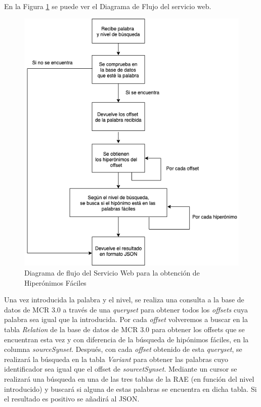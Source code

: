 En la Figura \ref{fig:swhiperonimos} se puede ver el Diagrama de Flujo del servicio web.
\begin{figure}[!h]
	\includegraphics[width=.9\textwidth]{Imagenes/Bitmap/Capitulo4/ServiciosWeb/DiagramaFlujoHiperonimos.png}
	\centering
	\caption{Diagrama de flujo del Servicio Web para la obtención de Hiperónimos Fáciles}
	\label{fig:swhiperonimos}
\end{figure}

Una vez introducida la palabra y el nivel, se realiza una consulta a la base de datos de MCR 3.0 a través de una \textit{queryset} para obtener todos los \textit{offsets} cuya palabra sea igual que la introducida.
Por cada \textit{offset} volveremos a buscar en la tabla \textit{Relation} de la base de datos de MCR 3.0 para obtener los offsets que se encuentran esta vez y con diferencia de la búsqueda de hipónimos fáciles, en la columna \textit{sourceSynset}. Después, con cada \textit{offset} obtenido de esta \textit{queryset}, se realizará la búsqueda en la tabla \textit{Variant} para obtener las palabras cuyo identificador sea igual que el offset de \textit{sourcetSynset}.
Mediante un cursor se realizará una búsqueda en una de las tres tablas de la RAE (en función del nivel introducido) y buscará si alguna de estas palabras se encuentra en dicha tabla.
Si el resultado es positivo se añadirá al JSON.

